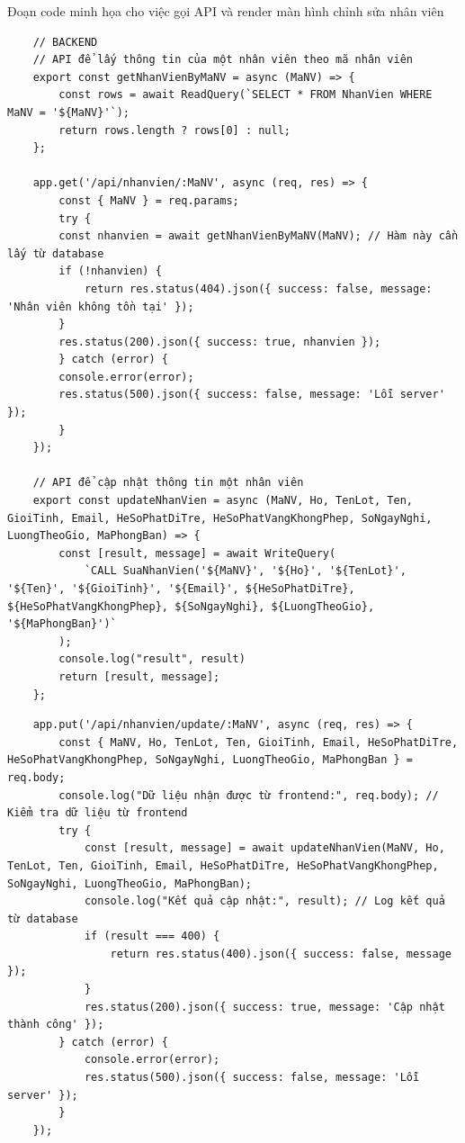 \newpage
Đoạn code minh họa cho việc gọi API và render màn hình chỉnh sửa nhân viên
\begin{verbatim}
    // BACKEND
    // API để lấy thông tin của một nhân viên theo mã nhân viên
    export const getNhanVienByMaNV = async (MaNV) => {
        const rows = await ReadQuery(`SELECT * FROM NhanVien WHERE MaNV = '${MaNV}'`);
        return rows.length ? rows[0] : null;
    };

    app.get('/api/nhanvien/:MaNV', async (req, res) => {
        const { MaNV } = req.params;
        try {
        const nhanvien = await getNhanVienByMaNV(MaNV); // Hàm này cần lấy từ database
        if (!nhanvien) {
            return res.status(404).json({ success: false, message: 'Nhân viên không tồn tại' });
        }
        res.status(200).json({ success: true, nhanvien });
        } catch (error) {
        console.error(error);
        res.status(500).json({ success: false, message: 'Lỗi server' });
        }
    });

    // API để cập nhật thông tin một nhân viên
    export const updateNhanVien = async (MaNV, Ho, TenLot, Ten, GioiTinh, Email, HeSoPhatDiTre, HeSoPhatVangKhongPhep, SoNgayNghi, LuongTheoGio, MaPhongBan) => {
        const [result, message] = await WriteQuery(
            `CALL SuaNhanVien('${MaNV}', '${Ho}', '${TenLot}', '${Ten}', '${GioiTinh}', '${Email}', ${HeSoPhatDiTre}, ${HeSoPhatVangKhongPhep}, ${SoNgayNghi}, ${LuongTheoGio}, '${MaPhongBan}')`
        );
        console.log("result", result)
        return [result, message];
    };
\end{verbatim}
\begin{verbatim}
    app.put('/api/nhanvien/update/:MaNV', async (req, res) => {
        const { MaNV, Ho, TenLot, Ten, GioiTinh, Email, HeSoPhatDiTre, HeSoPhatVangKhongPhep, SoNgayNghi, LuongTheoGio, MaPhongBan } = req.body;
        console.log("Dữ liệu nhận được từ frontend:", req.body); // Kiểm tra dữ liệu từ frontend
        try {
            const [result, message] = await updateNhanVien(MaNV, Ho, TenLot, Ten, GioiTinh, Email, HeSoPhatDiTre, HeSoPhatVangKhongPhep, SoNgayNghi, LuongTheoGio, MaPhongBan);
            console.log("Kết quả cập nhật:", result); // Log kết quả từ database
            if (result === 400) {
                return res.status(400).json({ success: false, message });
            }
            res.status(200).json({ success: true, message: 'Cập nhật thành công' });
        } catch (error) {
            console.error(error);
            res.status(500).json({ success: false, message: 'Lỗi server' });
        }
    });
\end{verbatim}
